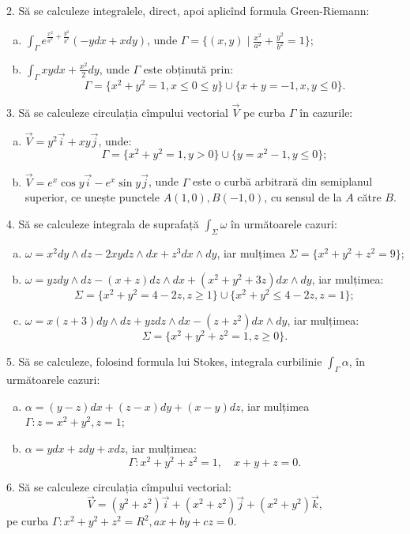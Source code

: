 \documentclass[12pt,a4paper]{article}
\newcommand\ds{\displaystyle}
\theoremstyle{dotless}
\theoremstyle{dotlessdr}
\begin{document}
\vspace{1cm}

2. Să se calculeze integralele, direct, apoi aplicînd formula Green-Riemann:
\begin{enumerate}[(a)]
\item $\ds\int_\Gamma e^{\frac{x^2}{a^2} + \frac{y^2}{b^2}} (-ydx + xdy)$, unde
  $\Gamma = \{(x, y) \mid \frac{x^2}{a^2} + \frac{y^2}{b^2} = 1 \}$;
\item $\ds\int_\Gamma xy dx + \frac{x^2}{2} dy$, unde $\Gamma$ este obținută prin:
  \[
    \Gamma = \{x^2 + y^2 = 1, x \leq 0 \leq y\} \cup \{x + y = -1, x,y \leq 0 \}.
  \]
\end{enumerate}

\vspace{1cm}

3. Să se calculeze circulația cîmpului vectorial $\vec{V}$ pe curba $\Gamma$ în
cazurile:
\begin{enumerate}[(a)]
\item $\vec{V} = y^2 \vec{i} + xy\vec{j}$, unde:
  \[
    \Gamma = \{x^2 + y^2 = 1, y > 0 \} \cup \{ y = x^2 - 1, y \leq 0 \};
  \]
\item $\vec{V} = e^x \cos y \vec{i} - e^x \sin y \vec{j}$, unde $\Gamma$ este
  o curbă arbitrară din semiplanul superior, ce unește punctele $A(1, 0), B(-1, 0)$,
  cu sensul de la $A$ către $B$.
\end{enumerate}

\vspace{1cm}

4. Să se calculeze integrala de suprafață $\int_\Sigma \omega$ în următoarele cazuri:
\begin{enumerate}[(a)]
\item $\omega = x^2 dy \wedge dz - 2xy dz \wedge dx + z^3 dx \wedge dy$, iar mulțimea
  $\Sigma = \{x^2 + y^2 + z^2 = 9 \}$;
\item $\omega = yz dy \wedge dz - (x + z) dz \wedge dx + (x^2 + y^2 + 3z) dx \wedge dy$,
  iar mulțimea:
  \[
    \Sigma = \{ x^2 + y^2 = 4 - 2z, z \geq 1 \} \cup \{x^2 + y^2 \leq 4 - 2z, z = 1 \};
  \]
\item $\omega = x(z + 3) dy \wedge dz + yz dz \wedge dx - (z + z^2) dx \wedge dy$,
  iar mulțimea:
  \[
    \Sigma = \{ x^2 + y^2 + z^2 = 1, z \geq 0\}.
  \]
\end{enumerate}

\vspace{1cm}

5. Să se calculeze, folosind formula lui Stokes, integrala curbilinie
$\int_\Gamma \alpha$, în următoarele cazuri:
\begin{enumerate}[(a)]
\item $\alpha = (y - z) dx + (z - x)dy + (x - y) dz$, iar mulțimea $\Gamma: z = x^2 + y^2, z = 1$;
\item $\alpha = ydx + zdy + xdz$, iar mulțimea:
  \[
    \Gamma: x^2 + y^2 + z^2 = 1, \quad x + y + z = 0.
  \]
\end{enumerate}

\vspace{1cm}

6. Să se calculeze circulația cîmpului vectorial:
\[
  \vec{V} = (y^2 + z^2)\vec{i} + (x^2 + z^2)\vec{j} + (x^2 + y^2)\vec{k},
\]
pe curba $\Gamma: x^2 + y^2 + z^2 = R^2, ax + by + cz = 0$.
\end{document}
